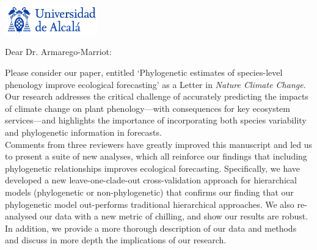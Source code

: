 \documentclass[11pt,a4paper]{letter}
\begin{document}
\begin{letter}{}
\includegraphics[width=0.3\textwidth]{logo_uah.png}

\opening{Dear Dr. Armarego-Marriot:} %

\noindent Please consider our paper, entitled `Phylogenetic estimates of species-level phenology improve ecological forecasting' as a Letter in \emph{Nature Climate Change}. Our research addresses the critical challenge of accurately predicting the impacts of climate change on plant phenology---with consequences for key ecosystem services---and highlights the importance of incorporating both species variability and phylogenetic information in forecasts.
\vspace{1.5ex}\\
Comments from three reviewers have greatly improved this manuscript and led us to present a suite of new analyses, which all reinforce our findings that including phylogenetic relationships improves ecological forecasting. Specifically, we have developed a new leave-one-clade-out cross-validation approach for hierarchical models (phylogenetic or non-phylogenetic) that confirms our finding that our phylogenetic model out-performs traditional hierarchical approaches. We also re-analysed our data with a new metric of chilling, and show our results are robust. In addition, we provide a more thorough description of our data and methods and discuss in more depth the implications of our research. 
\vspace{1.5ex}\\ %

\end{letter}
\end{document}
